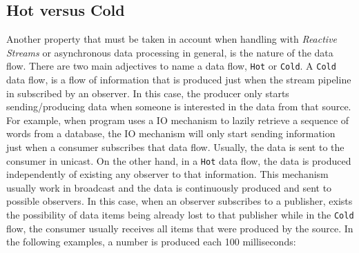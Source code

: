 	\subsection{Hot versus Cold}
	
	Another property that must be taken in account when handling with \textit{Reactive Streams} or asynchronous data processing in general, is the nature of the data flow. 
	There are two main adjectives to name a data flow, \texttt{Hot} or \texttt{Cold}. 
	A \texttt{Cold} data flow, is a flow of information that is produced just when the stream pipeline in subscribed by an observer. In this case, the producer only starts sending/producing data when someone is interested in the data from that source. 
	For example, when program uses a IO mechanism to lazily retrieve a sequence of words from a database, the IO mechanism will only start sending information just when a consumer subscribes that data flow. Usually, the data is sent to the consumer in unicast.
	On the other hand, in a \texttt{Hot} data flow, the data is produced independently of existing any observer to that information. This mechanism usually work in broadcast and the data is continuously produced and sent to possible observers.
	In this case, when an observer subscribes to a publisher, exists the possibility of data items being already lost to that publisher while in the \texttt{Cold} flow, the consumer usually receives all items that were produced by the source.
	In the following examples, a number is produced each 100 milliseconds:


